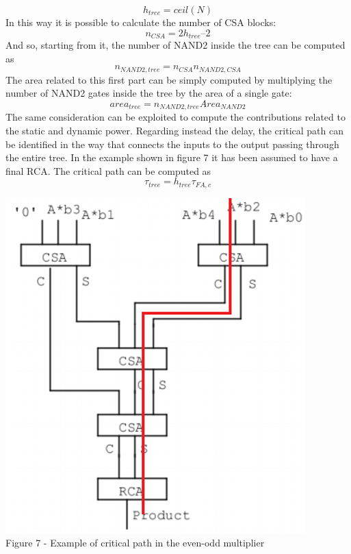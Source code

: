 \documentclass[11pt]{article} %
\begin{document}
$$ h_{tree} = ceil(N) $$
In this way it is possible to calculate the number of CSA blocks:
$$ n_{CSA} = 2 h_{tree} – 2 $$
And so, starting from it, the number of NAND2 inside the tree can be computed as
$$ n_{NAND2, tree} = n_{CSA}  n_{NAND2,CSA} $$
The area related to this first part can be simply computed by multiplying the number of NAND2 gates inside the tree by the area of a single gate:
$$ area_{tree} = n_{NAND2, tree} Area_{NAND2} $$
The same consideration can be exploited to compute the contributions related to the static and dynamic power. Regarding instead the delay, the critical path can be identified in the way that connects the inputs to the output passing through the entire tree. In the example shown in figure 7 it has been assumed to have a final RCA. The critical path can be computed as
$$ \tau_{tree} = h_{tree} \tau_{FA,c} $$
\vspace{1em}
\begin{center}
\includegraphics[scale=.42]{evenoddtcp.PNG}\\
\small{Figure 7 - Example of critical path in the even-odd multiplier}\\
\end{center}
\vspace{2em}
\end{document}

